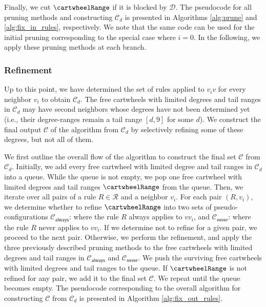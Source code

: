 \documentclass[10pt,a4paper]{article}
\begin{document}
Finally, we cut $\cartwheelRange$ if it is blocked by $\mathcal{D}$.
The pseudocode for all pruning methods and constructing $\mathcal{C}_d$ is presented in Algorithms \ref{alg:prune} and \ref{alg:fix_in_rules}, respectively. We note that the same code can be used for the initial pruning corresponding to the special case where $i=0$.
In the following, we apply these pruning methods at each branch.

\subsubsection{Refinement}
\label{subsub:refinement}
\newcommand{\cCalways}{\mathcal{C}_{\textsf{always}}\xspace}
\newcommand{\cCnever}{\mathcal{C}_{\textsf{never}}\xspace}
Up to this point, we have determined the set of rules applied to $v_iv$ for every neighbor $v_i$ to obtain $\mathcal{C}_d$.
The free cartwheels with limited degrees and tail ranges in $\mathcal{C}_d$ may have second neighbors whose degrees have not been determined yet (i.e., their degree-ranges remain a tail range $[d, 9]$ for some $d$).
We construct the final output $\mathcal{C}$ of the algorithm from $\mathcal{C}_d$ by selectively refining some of these degrees, but not all of them.

We first outline the overall flow of the algorithm to construct the final set $\mathcal{C}$ from $\mathcal{C}_d$.
Initially, we add every free cartwheel with limited degree and tail ranges in $\mathcal{C}_d$ into a queue.
While the queue is not empty, we pop one free cartwheel with limited degrees and tail ranges $\cartwheelRange$ from the queue.
Then, we iterate over all pairs of a rule $R \in \mathcal{R}$ and a neighbor $v_i$.
For each pair $(R, v_i)$, we determine whether to refine $\cartwheelRange$ into two sets of pseudo-configurations $\cCalways$: where the rule $R$ always applies to $vv_i$, and $\cCnever$: where the rule $R$ never applies to $vv_i$.
If we determine not to refine for a given pair, we proceed to the next pair.
Otherwise, we perform the refinement, and apply the three previously described pruning methods to the free cartwheels with limited degrees and tail ranges in $\cCalways$ and $\cCnever$.
We push the surviving free cartwheels with limited degrees and tail ranges to the queue.
If $\cartwheelRange$ is not refined for any pair, we add it to the final set $\mathcal{C}$.
We repeat until the queue becomes empty.
The pseudocode corresponding to the overall algorithm for constructing $\mathcal{C}$ from $\mathcal{C}_d$ is presented in Algorithm \ref{alg:fix_out_rules}.
\end{document}
